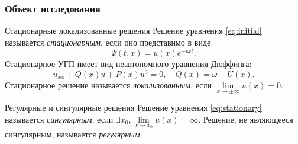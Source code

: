 \documentclass [10pt] {beamer}
\begin{document}
\begin{frame}
	\frametitle{Объект исследования}

	\begin{block}{Стационарные локализованные решения}
	 	Решение уравнения \eqref{eq:initial} называется {\it \color{ceruleanblue} стационарным}, если оно представимо в виде
	 	\begin{equation}
			\Psi(t, x) = u(x) e^{-i \omega t}.	 		
	 	\end{equation}
		Стационарное УГП имеет вид неавтономного уравнения Дюффинга:
		\begin{equation}
			u_{xx} + Q(x) u + P(x) u^3 = 0, \quad Q(x) = \omega - U(x).
			\label{eq:stationary}
		\end{equation}
		Стационарное решение называется {\it \color{ceruleanblue} локализованным}, если $\lim \limits_{x \to \pm \infty} u(x) = 0$.
	\end{block}

	\medskip

	\begin{block}{Регулярные и сингулярные решения}
		Решение уравнения \eqref{eq:stationary} называется {\it \color{ceruleanblue} сингулярным}, если $\exists x_0, \lim \limits_{x \to x_0} u(x) = \infty$.
		Решение, не являющееся сингулярным, называется {\it \color{ceruleanblue} регулярным}.
	\end{block}
\end{frame}
\end{document}
